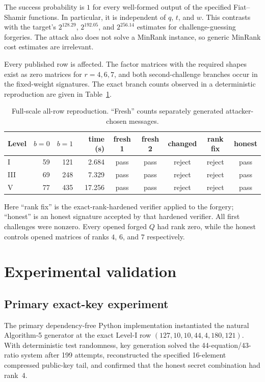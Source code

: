\documentclass[10pt,a4paper]{article}
\begin{document}
The success probability is $1$ for every well-formed output of the specified
Fiat--Shamir functions.  In particular, it is independent of $q$, $t$, and
$w$.  This contrasts with the target's $2^{128.29}$, $2^{192.05}$, and
$2^{256.14}$ estimates for challenge-guessing forgeries.  The attack also
does not solve a MinRank instance, so generic MinRank cost estimates are
irrelevant.

Every published row is affected.  The factor matrices with the required
shapes exist as zero matrices for $r=4,6,7$, and both second-challenge branches
occur in the fixed-weight signatures.  The exact branch counts observed in a
deterministic reproduction are given in Table~\ref{tab:allrows}.

\begin{table}[ht]
\centering
\caption{Full-scale all-row reproduction.  ``Fresh'' counts separately
generated attacker-chosen messages.}
\label{tab:allrows}
\small
\begin{tabular}{@{}lrrrccccc@{}}
\toprule
Level & $b=0$ & $b=1$ & time (s) & fresh 1 & fresh 2 & changed & rank fix & honest \\
\midrule
I   & 59 & 121 & 2.684  & pass & pass & reject & reject & pass \\
III & 69 & 248 & 7.329  & pass & pass & reject & reject & pass \\
V   & 77 & 435 & 17.256 & pass & pass & reject & reject & pass \\
\bottomrule
\end{tabular}
\end{table}

Here ``rank fix'' is the exact-rank-hardened verifier applied to the forgery;
``honest'' is an honest signature accepted by that hardened verifier.  All
first challenges were nonzero.  Every opened forged $Q$ had rank zero, while
the honest controls opened matrices of ranks $4$, $6$, and $7$ respectively.

\section{Experimental validation}

\subsection{Primary exact-key experiment}

The primary dependency-free Python implementation instantiated the natural
Algorithm-5 generator at the exact Level-I row
$(127,10,10,44,4,180,121)$.  With deterministic test randomness, key
generation solved the 44-equation/43-ratio system after 199 attempts,
reconstructed the specified 16-element compressed public-key tail, and
confirmed that the honest secret combination had rank~4.
\end{document}
